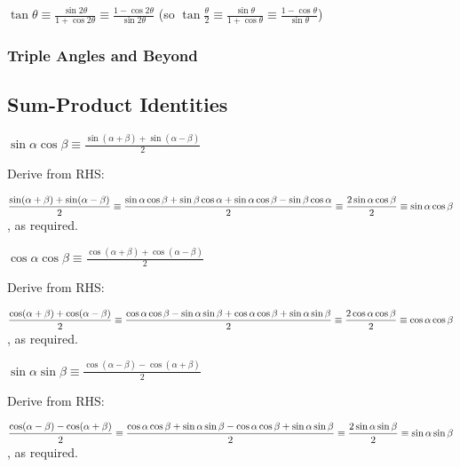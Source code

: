 \documentclass[a4paper,11pt]{article}
\begin{document}
    $\displaystyle \tan \theta
        \equiv \frac{\sin 2 \theta}{1 + \cos 2 \theta}
        \equiv \frac{1 - \cos 2 \theta}{\sin 2 \theta}$
    (so $\displaystyle \tan \frac \theta 2
        \equiv \frac{\sin \theta}{1 + \cos \theta}
        \equiv \frac{1 - \cos \theta}{\sin \theta}$)

    \subsubsection{Triple Angles and Beyond}

    \subsection{Sum-Product Identities} \label{sec:trig_sum_product}

    $\displaystyle \boxed{\sin \alpha \cos \beta \equiv
        \frac{\sin(\alpha + \beta) + \sin(\alpha - \beta)} 2}$

    Derive from RHS:

    $\displaystyle \frac{\sin(\alpha + \beta) + \sin(\alpha - \beta)} 2 \equiv
     \frac{\sin \alpha \cos \beta + \sin \beta \cos \alpha +
           \sin \alpha \cos \beta - \sin \beta \cos \alpha} 2 \\\\\equiv
     \frac{2 \sin \alpha \cos \beta} 2 \equiv \sin \alpha \cos \beta$,
    as required.

    $\displaystyle \boxed{\cos \alpha \cos \beta \equiv
     \frac{\cos(\alpha + \beta) + \cos(\alpha - \beta)} 2}$

    Derive from RHS:

    $\displaystyle \frac{\cos(\alpha + \beta) + \cos(\alpha - \beta)} 2 \equiv
     \frac{\cos \alpha \cos \beta - \sin \alpha \sin \beta +
           \cos \alpha \cos \beta + \sin \alpha \sin \beta} 2 \\\\\equiv
     \frac{2 \cos \alpha \cos \beta} 2 \equiv \cos \alpha \cos \beta$,
    as required.

    $\displaystyle \boxed{\sin \alpha \sin \beta \equiv
     \frac{\cos(\alpha - \beta) - \cos(\alpha + \beta)} 2}$

    Derive from RHS:

    $\displaystyle \frac{\cos(\alpha - \beta) - \cos(\alpha + \beta)} 2 \equiv
     \frac{\cos \alpha \cos \beta + \sin \alpha \sin \beta -
           \cos \alpha \cos \beta + \sin \alpha \sin \beta} 2 \\\\\equiv
     \frac{2 \sin \alpha \sin \beta} 2 \equiv \sin \alpha \sin \beta$,
    as required.
\end{document}
